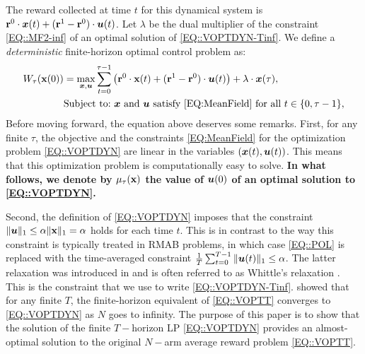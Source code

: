 The reward collected at time $t$ for this dynamical system is $\mathbf{r}^{0}\cdot {\bm{x}}(t) + (\mathbf{r}^{1} - \mathbf{r}^{0})\cdot\bm{u}(t)$. Let $\lambda$ be the dual multiplier of the constraint \eqref{EQ::MF2-inf} of an optimal solution of \eqref{EQ::VOPTDYN-Tinf}. We define a \emph{deterministic} finite-horizon optimal control problem as:
\begin{subequations}
    \label{EQ::VOPTDYN}
    \begin{align}
       W_{\tau}{(\textbf{x}(0))} &= \max_{{\bm{x}}, \bm{u}} \sum_{t = 0}^{\tau - 1} \left( \mathbf{r}^{0}\cdot \textbf{x}(t) + (\mathbf{r}^{1} - \mathbf{r}^{0})\cdot\bm{u}(t)\right) + \lambda \cdot{\bm{x}}(\tau),\label{EQ:VOPTDYN1}\\
         &\text{Subject to:} \text{ ${\bm{x}}$  and $\bm{u}$ satisfy \eqref{EQ:MeanField} for all $t\in\{0,\tau-1\}$,}
    \end{align}
\end{subequations} 
Before moving forward, the equation above deserves some remarks. First, for any finite $\tau$, the objective and the constraints \eqref{EQ:MeanField} for the optimization problem \eqref{EQ::VOPTDYN} are linear in the variables $({\bm{x}}(t),\bm{u}(t))$. This means that this optimization problem is computationally easy to solve. \textbf{In what follows, we denote by $\mu_{\tau}(\textbf{x})$ the value of $\bm{u}(0)$ of an optimal solution to \eqref{EQ::VOPTDYN}.}

Second, the definition of \eqref{EQ::VOPTDYN} imposes that the constraint $\|\bm{u}\|_1 \leq \alpha \|\textbf{x}\|_1 = \alpha $ holds for each time $t$. This is in contrast to the way this constraint is typically treated in RMAB problems, in which case \eqref{EQ::POL} is replaced with the time-averaged constraint $\frac{1}{T}\sum_{t = 0}^{T - 1}\|\bm{u}(t)\|_1 \leq \alpha$. The latter relaxation was introduced in \cite{Wh88} and is often referred to as Whittle's relaxation \citep{Avrachenkov2020WhittleIB,Avrachenkov2021}. This is the constraint that we use to write  \eqref{EQ::VOPTDYN-Tinf}.  \cite{GGY23} showed that for any finite $T$, the finite-horizon equivalent of \eqref{EQ::VOPTT} converges to \eqref{EQ::VOPTDYN} as $N$ goes to infinity. The purpose of this paper is to show that the solution of the finite $T-$horizon LP \eqref{EQ::VOPTDYN} provides an almost-optimal solution to the original $N-$arm average reward problem \eqref{EQ::VOPTT}. 

